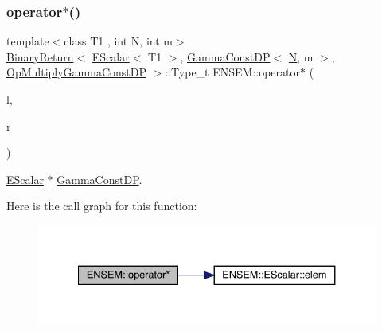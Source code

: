\subsubsection{\texorpdfstring{operator$\ast$()}{operator*()}\hspace{0.1cm}{\footnotesize\ttfamily [7/9]}}
{\footnotesize\ttfamily template$<$class T1 , int N, int m$>$ \\
\mbox{\hyperlink{structENSEM_1_1BinaryReturn}{Binary\+Return}}$<$ \mbox{\hyperlink{classENSEM_1_1EScalar}{E\+Scalar}}$<$ T1 $>$, \mbox{\hyperlink{classENSEM_1_1GammaConstDP}{Gamma\+Const\+DP}}$<$ \mbox{\hyperlink{adat__devel_2lib_2hadron_2operator__name__util_8cc_a7722c8ecbb62d99aee7ce68b1752f337}{N}}, m $>$, \mbox{\hyperlink{structENSEM_1_1OpMultiplyGammaConstDP}{Op\+Multiply\+Gamma\+Const\+DP}} $>$\+::Type\+\_\+t E\+N\+S\+E\+M\+::operator$\ast$ (\begin{DoxyParamCaption}\item[{const \mbox{\hyperlink{classENSEM_1_1EScalar}{E\+Scalar}}$<$ T1 $>$ \&}]{l,  }\item[{const \mbox{\hyperlink{classENSEM_1_1GammaConstDP}{Gamma\+Const\+DP}}$<$ \mbox{\hyperlink{adat__devel_2lib_2hadron_2operator__name__util_8cc_a7722c8ecbb62d99aee7ce68b1752f337}{N}}, m $>$ \&}]{r }\end{DoxyParamCaption})\hspace{0.3cm}{\ttfamily [inline]}}



\mbox{\hyperlink{classENSEM_1_1EScalar}{E\+Scalar}} $\ast$ \mbox{\hyperlink{classENSEM_1_1GammaConstDP}{Gamma\+Const\+DP}}. 

Here is the call graph for this function\+:
\nopagebreak
\begin{figure}[H]
\begin{center}
\leavevmode
\includegraphics[width=334pt]{d4/dca/group__escalar_gaa60096d471282c83dab865d42b53ce96_cgraph}
\end{center}
\end{figure}
\mbox{\label{group__escalar_ga54ffca46c333d9dad30043eb6cef6299}} 
